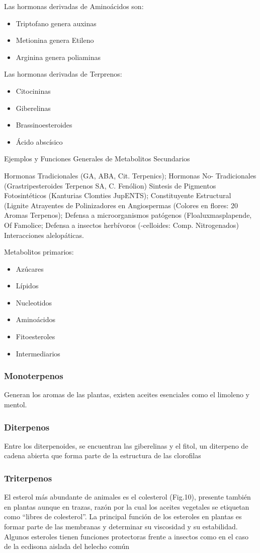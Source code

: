 Las hormonas derivadas de Aminoácidos son:
\begin{itemize}
    \item Triptofano genera auxinas
    \item Metionina genera Etileno
    \item Arginina genera poliaminas
\end{itemize}
Las hormonas derivadas de Terprenos:
\begin{itemize}
    \item Citocininas
    \item Giberelinas
    \item Brassinoesteroides
    \item Ácido abscísico
\end{itemize}

Ejemplos y Funciones Generales de Metabolitos Secundarios

Hormonas Tradicionales (GA, ABA, Cit. Terpenics);
Hormonas No- Tradicionales (Grastripesteroides Terpenos SA, C. Fenólion) Sintesis de Pigmentos Fotosintéticos (Kanturias Clomties JupENTS);
Constituyente Estructural (Lignite Atrayentes de Polinizadores en Angiospermas (Colores en flores: 20 Aromas Terpenos);
Defensa a microorganismos patógenos (Floaluxmasplapende, Of Famolice;
Defensa a insectos herbívoros (-celloides: Comp. Nitrogenados)
Interacciones alelopáticas.

Metabolitos primarios:
\begin{itemize}
    \item Azúcares
    \item Lípidos
    \item Nucleotidos
    \item Aminoácidos
    \item Fitoesteroles
    \item Intermediarios
\end{itemize}

\subsubsection{Monoterpenos}
Generan los aromas de las plantas, existen aceites esenciales como el limoleno y mentol.
\subsubsection{Diterpenos}
Entre los diterpenoides, se encuentran las giberelinas y el fitol, un diterpeno de cadena abierta que forma parte de la estructura de las clorofilas 
\subsubsection{Triterpenos}
El esterol más abundante de animales es el colesterol (Fig.10), presente también en plantas aunque en trazas, razón por la cual los aceites vegetales se etiquetan como ``libres de colesterol''.
La principal función de los esteroles en plantas es formar parte de las membranas y determinar su viscosidad y su estabilidad. Algunos esteroles tienen funciones protectoras frente a insectos como en el caso de la ecdisona aislada del helecho común

